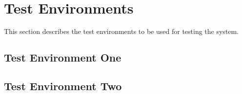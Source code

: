 
\chapter{Test Environments}
\label{loc:TestEnvironments}


This section describes the test environments to be used for testing the system.
\DIDINFOOFF%

\section{Test Environment One}
\label{loc:TestEnvironmentOne}
\newcommand{\TestEnvName}{TEone}%



\section{Test Environment Two}
\label{loc:TestEnvironmentTwo}
\renewcommand{\TestEnvName}{TEtwo}%





